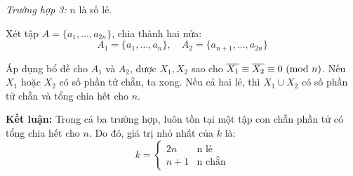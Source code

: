 \documentclass[../09-contruction-methods.tex]{subfiles}
\begin{document}
\begin{soln}
	\textit{Trường hợp 3:} \( n \) là số lẻ.

	Xét tập \( A = \{a_1, \dots, a_{2n}\} \), chia thành hai nửa:
	\[
		A_1 = \{a_1, \dots, a_n\},\quad A_2 = \{a_{n+1}, \dots, a_{2n}\}
	\]

	Áp dụng bổ đề cho \( A_1 \) và \( A_2 \), được \( X_1, X_2 \) sao cho \( \overline{X_1} \equiv \overline{X_2} \equiv 0 \ (\mathrm{mod}\ n) \). Nếu \( X_1 \) hoặc \( X_2 \) có số phần tử chẵn, ta xong. Nếu cả hai lẻ, thì \( X_1 \cup X_2 \) có số phần tử chẵn và tổng chia hết cho \( n \).

	\textbf{Kết luận:} Trong cả ba trường hợp, luôn tồn tại một tập con chẵn phần tử có tổng chia hết cho \( n \). Do đó, giá trị nhỏ nhất của \( k \) là:
	\[
		k = \begin{cases}
			2n & \text{n lẻ} \\
			n + 1 & \text{n chẵn}
		\end{cases}
	\]
\end{soln}

\end{document}

